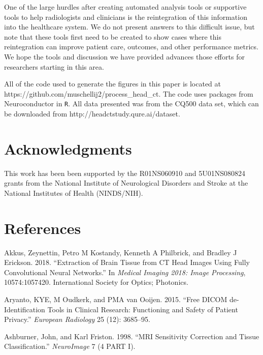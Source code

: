 \documentclass[]{elsarticle} %
\begin{document}
One of the large hurdles after creating automated analysis tools or supportive tools to help radiologists and clinicians is the reintegration of this information into the healthcare system. We do not present answers to this difficult issue, but note that these tools first need to be created to show cases where this reintegration can improve patient care, outcomes, and other performance metrics. We hope the tools and discussion we have provided advances those efforts for researchers starting in this area.

All of the code used to generate the figures in this paper is located at https://github.com/muschellij2/process\_head\_ct. The code uses packages from Neuroconductor in \texttt{R}. All data presented was from the CQ500 data set, which can be downloaded from http://headctstudy.qure.ai/dataset.

\hypertarget{acknowledgments}{%
\section{Acknowledgments}\label{acknowledgments}}

This work has been been supported by the R01NS060910 and 5U01NS080824 grants from the National Institute of Neurological Disorders and Stroke at the National Institutes of Health (NINDS/NIH).

\hypertarget{references}{%
\section*{References}\label{references}}

\hypertarget{refs}{}
\leavevmode\hypertarget{ref-ct_bet}{}%
Akkus, Zeynettin, Petro M Kostandy, Kenneth A Philbrick, and Bradley J Erickson. 2018. ``Extraction of Brain Tissue from CT Head Images Using Fully Convolutional Neural Networks.'' In \emph{Medical Imaging 2018: Image Processing}, 10574:1057420. International Society for Optics; Photonics.

\leavevmode\hypertarget{ref-aryanto2015free}{}%
Aryanto, KYE, M Oudkerk, and PMA van Ooijen. 2015. ``Free DICOM de-Identification Tools in Clinical Research: Functioning and Safety of Patient Privacy.'' \emph{European Radiology} 25 (12): 3685--95.

\leavevmode\hypertarget{ref-ashburner1998mri}{}%
Ashburner, John, and Karl Friston. 1998. ``MRI Sensitivity Correction and Tissue Classification.'' \emph{NeuroImage} 7 (4 PART I).
\end{document}
